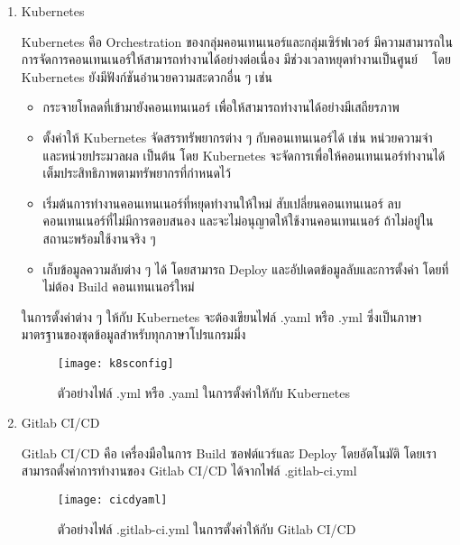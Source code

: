 \begin{enumerate}
	\item Kubernetes	
	
	Kubernetes คือ Orchestration ของกลุ่มคอนเทนเนอร์และกลุ่มเซิร์ฟเวอร์ มีความสามารถในการจัดการคอนเทนเนอร์ให้สามารถทำงานได้อย่างต่อเนื่อง มีช่วงเวลาหยุดทำงานเป็นศูนย์ 	 ~\cite{kubernetes} โดย Kubernetes ยังมีฟังก์ชันอำนวยความสะดวกอื่น ๆ เช่น
	\begin{itemize}
		\item กระจายโหลดที่เข้ามายังคอนเทนเนอร์ เพื่อให้สามารถทำงานได้อย่างมีเสถียรภาพ
		\item ตั้งค่าให้ Kubernetes จัดสรรทรัพยากรต่าง ๆ กับคอนเทนเนอร์ได้ เช่น หน่วยความจำ และหน่วยประมวลผล เป็นต้น โดย Kubernetes จะจัดการเพื่อให้คอนเทนเนอร์ทำงานได้เต็มประสิทธิภาพตามทรัพยากรที่กำหนดไว้
		\item เริ่มต้นการทำงานคอนเทนเนอร์ที่หยุดทำงานให้ใหม่ สับเปลี่ยนคอนเทนเนอร์ ลบคอนเทนเนอร์ที่ไม่มีการตอบสนอง และจะไม่อนุญาตให้ใช้งานคอนเทนเนอร์ ถ้าไม่อยู่ในสถานะพร้อมใช้งานจริง ๆ
		\item เก็บข้อมูลความลับต่าง ๆ ได้ โดยสามารถ Deploy และอัปเดตข้อมูลลับและการตั้งค่า โดยที่ไม่ต้อง Build คอนเทนเนอร์ใหม่
	\end{itemize}
	ในการตั้งค่าต่าง ๆ ให้กับ Kubernetes จะต้องเขียนไฟล์ .yaml หรือ .yml ซึ่งเป็นภาษามาตรฐานของชุดข้อมูลสำหรับทุกภาษาโปรแกรมมิ่ง ~\cite{yaml}
	
	\begin{figure}[!h]
		\centering
		\texttt{[image: k8sconfig]}  
		\caption{ตัวอย่างไฟล์ .yml หรือ .yaml ในการตั้งค่าให้กับ Kubernetes}
		\label{Fig:cicdyaml}
	\end{figure}
	
	\item Gitlab CI/CD
	
	Gitlab CI/CD คือ เครื่องมือในการ Build ซอฟต์แวร์และ Deploy โดยอัตโนมัติ โดยเราสามารถตั้งค่าการทำงานของ Gitlab CI/CD ได้จากไฟล์ .gitlab-ci.yml ~\cite{gitlabcicd}
	
	\begin{figure}[!h]
		\centering
		\texttt{[image: cicdyaml]}  
		\caption{ตัวอย่างไฟล์ .gitlab-ci.yml ในการตั้งค่าให้กับ Gitlab CI/CD}
		\label{Fig:cicdyaml}
	\end{figure}		
\end{enumerate}

